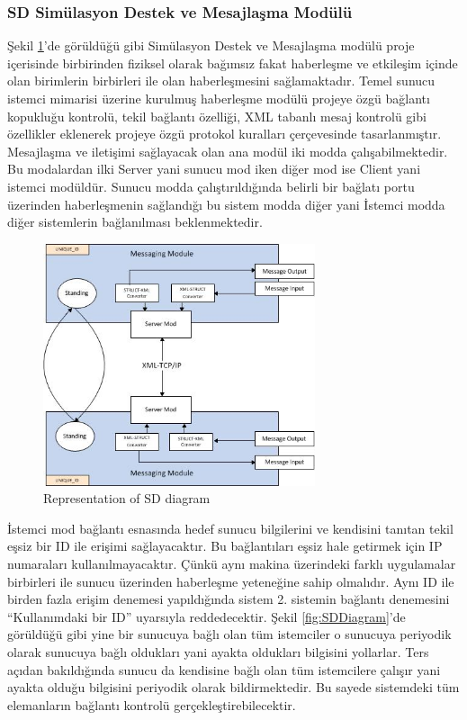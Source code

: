 \documentclass[conference]{IEEEtran}
\begin{document}
\subsubsection{SD Simülasyon Destek ve Mesajlaşma Modülü}

Şekil \ref{fig:RepresentationSDDiagram}'de görüldüğü gibi Simülasyon Destek ve Mesajlaşma modülü proje içerisinde birbirinden fiziksel olarak bağımsız fakat haberleşme ve etkileşim içinde olan birimlerin birbirleri ile olan haberleşmesini sağlamaktadır.
Temel sunucu istemci mimarisi üzerine kurulmuş haberleşme modülü projeye özgü bağlantı kopukluğu kontrolü, tekil bağlantı özelliği, XML tabanlı mesaj kontrolü gibi özellikler eklenerek projeye özgü protokol kuralları çerçevesinde tasarlanmıştır.
Mesajlaşma ve iletişimi sağlayacak olan ana modül iki modda çalışabilmektedir. Bu modalardan ilki Server yani sunucu mod iken diğer mod ise Client yani istemci modüldür. Sunucu modda çalıştırıldığında belirli bir bağlatı portu üzerinden haberleşmenin sağlandığı bu sistem modda diğer yani İstemci modda diğer sistemlerin bağlanılması beklenmektedir. 

\begin{figure}[h!]
  \centering
  \includegraphics[width=8cm]{RepresentationSDDiagram.jpg}
  \caption{Representation of SD  diagram}\label{fig:RepresentationSDDiagram}
\end{figure}

İstemci mod bağlantı esnasında hedef sunucu bilgilerini ve kendisini tanıtan tekil eşsiz bir ID ile erişimi sağlayacaktır. Bu bağlantıları eşsiz hale getirmek için IP numaraları kullanılmayacaktır. Çünkü aynı makina üzerindeki farklı uygulamalar birbirleri ile sunucu üzerinden haberleşme yeteneğine sahip olmalıdır. Aynı ID ile birden fazla erişim denemesi yapıldığında sistem 2. sistemin bağlantı denemesini “Kullanımdaki bir ID” uyarsıyla reddedecektir. 
Şekil \ref{fig:SDDiagram}'de görüldüğü gibi yine bir sunucuya bağlı olan tüm istemciler o sunucuya periyodik olarak sunucuya bağlı oldukları yani ayakta oldukları bilgisini yollarlar. Ters açıdan bakıldığında sunucu da kendisine bağlı olan tüm istemcilere çalışır yani ayakta olduğu bilgisini periyodik olarak bildirmektedir. Bu sayede sistemdeki tüm elemanların bağlantı kontrolü gerçekleştirebilecektir. 
\end{document}

